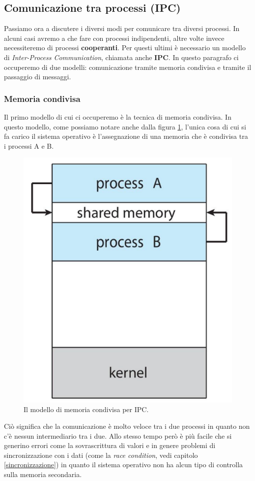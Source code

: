 % 
\subsection{Comunicazione tra processi (IPC)}\label{IPC}
Passiamo ora a discutere i diversi modi per comunicare tra diversi processi. In alcuni casi avremo a che fare con processi indipendenti, altre volte invece necessiteremo di processi \textbf{cooperanti}. Per questi ultimi è necessario un modello di \textit{Inter-Process Communication}, chiamata anche \textbf{IPC}. In questo paragrafo ci occuperemo di due modelli: comunicazione tramite memoria condivisa e tramite il passaggio di messaggi.

% 
\subsubsection{Memoria condivisa}
Il primo modello di cui ci occuperemo è la tecnica di memoria condivisa. In questo modello, come possiamo notare anche dalla figura \ref{fig:shared_memory}, l'unica cosa di cui si fa carico il sistema operativo è l'assegnazione di una memoria che è condivisa tra i processi A e B.
\begin{figure}[h]
    \centering
    \includegraphics[width = .25\textwidth]{../res/imgs/processes/shared_memory.png}
    \caption{Il modello di memoria condivisa per IPC.}
    \label{fig:shared_memory}
\end{figure}
Ciò significa che la comunicazione è molto veloce tra i due processi in quanto non c'è nessun intermediario tra i due. Allo stesso tempo però è più facile che si generino errori come la sovrascrittura di valori e in genere problemi di sincronizzazione con i dati (come la \textit{race condition}, vedi capitolo \ref{sincronizzazione}) in quanto il sistema operativo non ha alcun tipo di controlla sulla memoria secondaria.

